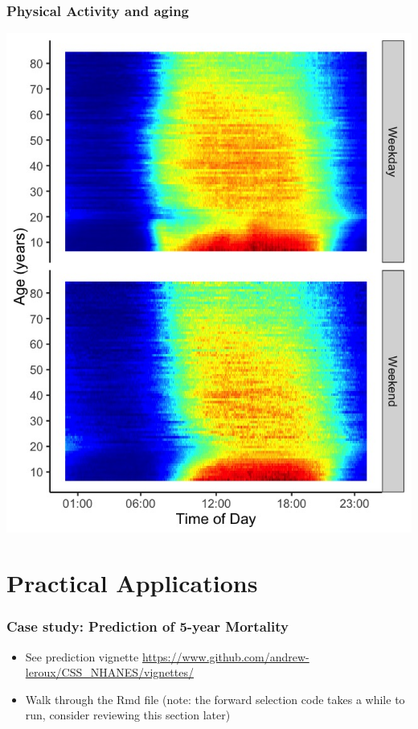 \documentclass[10pt]{beamer}\usepackage[]{graphicx}\usepackage[]{color}
\begin{document}
\begin{frame}
\frametitle{Physical Activity and aging}
\centering
\includegraphics[height=\textheight]{PA_profiles_by_age}
\end{frame}


















\section{Practical Applications}



\begin{frame}
\frametitle{Case study: Prediction of 5-year Mortality}
\begin{itemize}
\item See prediction vignette \url{https://www.github.com/andrew-leroux/CSS_NHANES/vignettes/}
\item Walk through the Rmd file (note: the forward selection code takes a while to run, consider reviewing this section later)
\end{itemize}
\end{frame}
\end{document}
